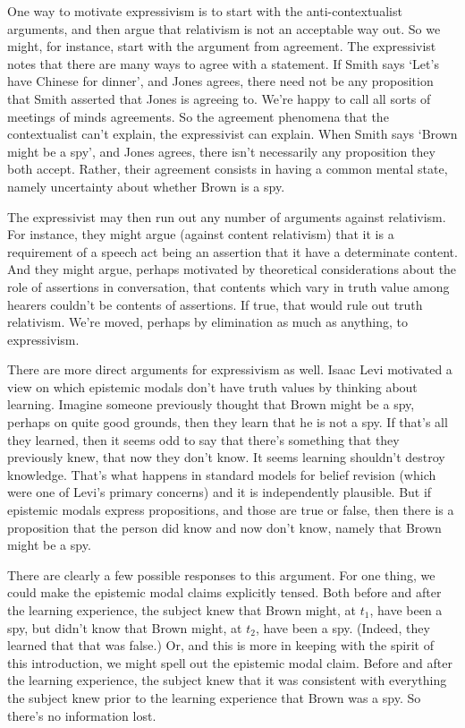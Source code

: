 One way to motivate expressivism is to start with the anti-contextualist arguments, and then argue that relativism is not an acceptable way out. So we might, for instance, start with the argument from agreement. The expressivist notes that there are many ways to agree with a statement. If Smith says `Let's have Chinese for dinner', and Jones agrees, there need not be any proposition that Smith asserted that Jones is agreeing to. We're happy to call all sorts of meetings of minds agreements. So the agreement phenomena that the contextualist can't explain, the expressivist can explain. When Smith says `Brown might be a spy', and Jones agrees, there isn't necessarily any proposition they both accept. Rather, their agreement consists in having a common mental state, namely uncertainty about whether Brown is a spy.

The expressivist may then run out any number of arguments against relativism. For instance, they might argue (against content relativism) that it is a requirement of a speech act being an assertion that it have a determinate content. And they might argue, perhaps motivated by theoretical considerations about the role of assertions in conversation, that contents which vary in truth value among hearers couldn't be contents of assertions. If true, that would rule out truth relativism. We're moved, perhaps by elimination as much as anything, to expressivism.

There are more direct arguments for expressivism as well. Isaac Levi \citeyearpar[55]{Levi1996} motivated a view on which epistemic modals don't have truth values by thinking about learning. Imagine someone previously thought that Brown might be a spy, perhaps on quite good grounds, then they learn that he is not a spy. If that's all they learned, then it seems odd to say that there's something that they previously knew, that now they don't know. It seems learning shouldn't destroy knowledge. That's what happens in standard models for belief revision (which were one of Levi's primary concerns) and it is independently plausible. But if epistemic modals express propositions, and those are true or false, then there is a proposition that the person did know and now don't know, namely that Brown might be a spy.

There are clearly a few possible responses to this argument. For one thing, we could make the epistemic modal claims explicitly tensed. Both before and after the learning experience, the subject knew that Brown might, at $t_1$, have been a spy, but didn't know that Brown might, at $t_2$, have been a spy. (Indeed, they learned that that was false.) Or, and this is more in keeping with the spirit of this introduction, we might spell out the epistemic modal claim. Before and after the learning experience, the subject knew that it was consistent with everything the subject knew prior to the learning experience that Brown was a spy. So there's no information lost.


